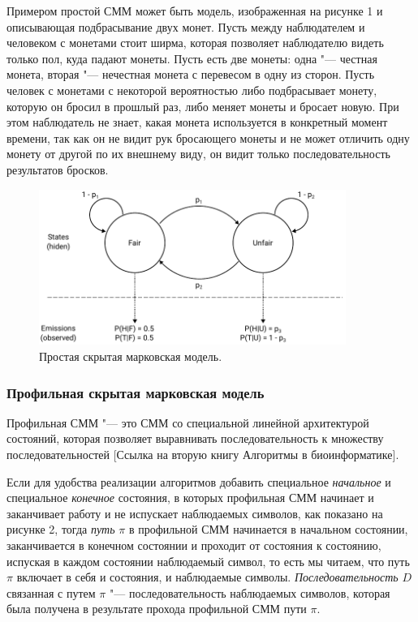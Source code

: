 \documentclass[]{article}
\begin{document}
			Примером простой СММ может быть модель, изображенная на рисунке 1 и описывающая подбрасывание двух монет. Пусть между наблюдателем и человеком с монетами стоит ширма, которая позволяет наблюдателю видеть только пол, куда падают монеты. Пусть есть две монеты: одна "--- честная монета, вторая "--- нечестная монета с перевесом в одну из сторон. Пусть человек с монетами с некоторой вероятностью либо подбрасывает монету, которую он бросил в прошлый раз, либо меняет монеты и бросает новую. При этом наблюдатель не знает, какая монета используется в конкретный момент времени, так как он не видит рук бросающего монеты и не может отличить одну монету от другой по их внешнему виду, он видит только последовательность результатов бросков.
			
			\begin{figure}[h]
				\includegraphics[width=10cm]{figure1}
				\centering
				\caption{Простая скрытая марковская модель.}
			\end{figure}
		
			\subsubsection{Профильная скрытая марковская модель}
			Профильная СММ "--- это СММ со специальной линейной архитектурой состояний, которая позволяет выравнивать последовательность к множеству последовательностей [Ссылка на вторую книгу Алгоритмы в биоинформатике].						
									
			Если для удобства реализации алгоритмов добавить специальное \textit{начальное} и специальное \textit{конечное} состояния, в которых профильная СММ начинает и заканчивает работу и не испускает наблюдаемых символов, как показано на рисунке 2, тогда \textit{путь} $\pi$ в профильной СММ начинается в начальном состоянии, заканчивается в конечном состоянии и проходит от состояния к состоянию, испуская в каждом состоянии наблюдаемый символ, то есть мы читаем, что путь $\pi$ включает в себя и состояния, и наблюдаемые символы. \textit{Последовательность} $D$ связанная с путем $\pi$ "--- последовательность наблюдаемых символов, которая была получена в результате прохода профильной СММ пути $\pi$. 
			
\end{document}
